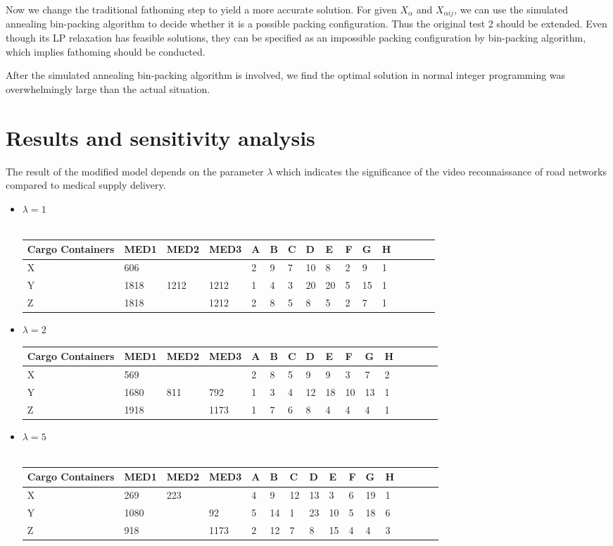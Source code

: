 \documentclass{mcmthesis}
\begin{document}
\noindent Now we change the traditional fathoming step to yield a more accurate solution. For given $X_\alpha$ and $X_{\alpha ij}$, we can use the simulated annealing bin-packing algorithm to decide whether it is a possible packing configuration. Thus the original test 2 should be extended. Even though its LP relaxation has feasible solutions, they can be specified as an impossible packing configuration by bin-packing algorithm, which implies fathoming should be conducted. 

\noindent After the simulated annealing bin-packing algorithm is involved, we find the optimal solution in normal integer programming was overwhelmingly large than the actual situation. 

\section{Results and sensitivity analysis}
The result of the modified model depends on the parameter $\lambda$ which indicates the significance of the video reconnaissance of
road networks compared to medical supply delivery.
\begin{itemize}
	\item $\lambda=1$\\
	~\\
	\begin{tabular}{llllllllllllllll}
		\hline	
		Cargo Containers&  MED1 & MED2 & MED3 & A & B & C & D & E & F & G & H \\
		\hline	 
		X & 606 & & &2 &9 & 7 & 10 & 8 & 2 &9 & 1\\  
		Y & 1818 & 1212 & 1212 &1 &4 & 3 & 20 & 20 & 5 &15 & 1\\    
		Z & 1818 &  & 1212 &2 &8 & 5 & 8 & 5 & 2 &7 & 1\\ 
		\hline
	\end{tabular}
	\item $\lambda=2$\\
	\begin{tabular}{llllllllllllllll}
		\hline	
		Cargo Containers&  MED1 & MED2 & MED3 & A & B & C & D & E & F & G & H \\
		\hline	 
		X & 569 & & &2 &8 & 5 & 9 & 9 & 3 &7 & 2\\  
		Y & 1680 & 811 & 792 &1 &3 & 4 & 12 & 18 & 10 &13 & 1\\    
		Z & 1918 &  & 1173 &1 &7 & 6 & 8 & 4 & 4 &4 & 1\\ 
		\hline
	\end{tabular}
	\item $\lambda=5$\\
	~\\
	\begin{tabular}{llllllllllllllll}
	\hline	
	Cargo Containers&  MED1 & MED2 & MED3 & A & B & C & D & E & F & G & H \\
	\hline	 
	X & 269 &223 & &4 &9 & 12 & 13 & 3 & 6 &19 & 1\\  
	Y & 1080 &  & 92 &5 &14 & 1 & 23 & 10 & 5 &18 & 6\\    
	Z & 918 &  & 1173 &2 &12 & 7 & 8 & 15 & 4 &4 & 3\\ 
	\hline
\end{tabular}
\end{itemize}
\end{document}

